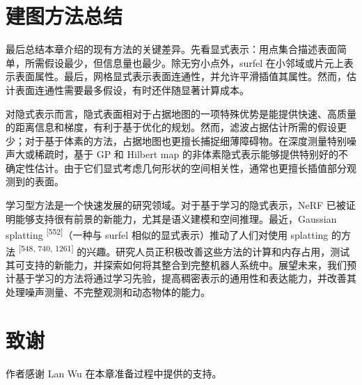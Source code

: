 \section{建图方法总结}

最后总结本章介绍的现有方法的关键差异。先看显式表示：用点集合描述表面简单，所需假设最少，但信息量也最少。除无穷小点外，surfel 在小邻域或片元上表示表面属性。最后，网格显式表示表面连通性，并允许平滑插值其属性。然而，估计表面连通性需要最多假设，有时还伴随显著计算成本。

对隐式表示而言，隐式表面相对于占据地图的一项特殊优势是能提供快速、高质量的距离信息和梯度，有利于基于优化的规划。然而，滤波占据估计所需的假设更少；对于基于体素的方法，占据地图也更擅长捕捉细薄障碍物。在深度测量特别噪声大或稀疏时，基于 GP 和 Hilbert map 的非体素隐式表示能够提供特别好的不确定性估计。由于它们显式考虑几何形状的空间相关性，通常也更擅长插值部分观测到的表面。

学习型方法是一个快速发展的研究领域。对于基于学习的隐式表示，NeRF 已被证明能够支持很有前景的新能力，尤其是语义建模和空间推理。最近，Gaussian splatting \textsuperscript{[552]}（一种与 surfel 相似的显式表示）推动了人们对使用 splatting 的方法 \textsuperscript{[548, 740, 1261]} 的兴趣。研究人员正积极改善这些方法的计算和内存占用，测试其可支持的新能力，并探索如何将其整合到完整机器人系统中。展望未来，我们预计基于学习的方法将通过学习先验，提高稠密表示的通用性和表达能力，并改善其处理噪声测量、不完整观测和动态物体的能力。

\section{致谢}

作者感谢 Lan Wu 在本章准备过程中提供的支持。
